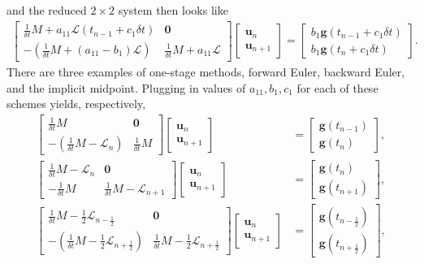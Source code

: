 \documentclass[a4paper,10pt]{article}
\begin{document}
%
and the reduced $2\times 2$ system then looks like
%
\begin{align*}
\begin{bmatrix} \frac{1}{\delta t} M + a_{11}\mathcal{L}(t_{n-1}+c_1\delta t) & \mathbf{0} \\ -(\frac{1}{\delta t} M + (a_{11}-b_1)\mathcal{L}) &
	 \frac{1}{\delta t} M + a_{11}\mathcal{L} \end{bmatrix}
	\begin{bmatrix} \mathbf{u}_n \\ \mathbf{u}_{n+1} \end{bmatrix} = 
	\begin{bmatrix} b_1 \mathbf{g}(t_{n-1}+c_1\delta t) \\ b_1 \mathbf{g}(t_{n}+c_1\delta t) \end{bmatrix}.
\end{align*}
%
There are three examples of one-stage methods, forward Euler, backward Euler, and the implicit midpoint. 
Plugging in values of $a_{11}, b_1, c_1$ for each of these schemes yields, respectively,
%
\begin{align*}
\begin{bmatrix} \frac{1}{\delta t}M & \mathbf{0} \\ -(\frac{1}{\delta t}M - \mathcal{L}_n) & \frac{1}{\delta t}M \end{bmatrix}
	\begin{bmatrix} \mathbf{u}_n \\ \mathbf{u}_{n+1} \end{bmatrix} & = 
	\begin{bmatrix} \mathbf{g}(t_{n-1}) \\ \mathbf{g}(t_{n}) \end{bmatrix}, \\
\begin{bmatrix} \frac{1}{\delta t}M -\mathcal{L}_n & \mathbf{0} \\ -\frac{1}{\delta t}M & \frac{1}{\delta t}M - \mathcal{L}_{n+1} \end{bmatrix}
	\begin{bmatrix} \mathbf{u}_n \\ \mathbf{u}_{n+1} \end{bmatrix} & = 
	\begin{bmatrix} \mathbf{g}(t_{n}) \\ \mathbf{g}(t_{n+1}) \end{bmatrix}, \\
\begin{bmatrix} \frac{1}{\delta t}M - \frac{1}{2}\mathcal{L}_{n-\frac{1}{2}} & \mathbf{0} \\ -(\frac{1}{\delta t}M - \frac{1}{2}\mathcal{L}_{n+\frac{1}{2}}) & \frac{1}{\delta t}M - \frac{1}{2}\mathcal{L}_{n+\frac{1}{2}} \end{bmatrix}
	\begin{bmatrix} \mathbf{u}_n \\ \mathbf{u}_{n+1} \end{bmatrix}  & = 
	\begin{bmatrix} \mathbf{g}(t_{n-\frac{1}{2}}) \\ \mathbf{g}(t_{n+\frac{1}{2}}) \end{bmatrix},
\end{align*}
\end{document}
